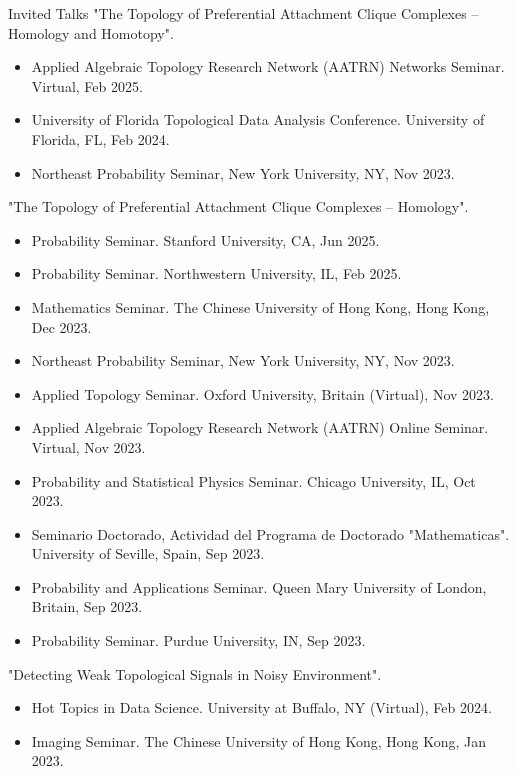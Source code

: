 \documentclass{resume} %
\begin{document}
\begin{rSection}{Invited Talks}
"The Topology of Preferential Attachment Clique Complexes -- Homology and Homotopy".
\begin{itemize}[noitemsep]
    \item Applied Algebraic Topology Research Network (AATRN) Networks Seminar. Virtual, Feb 2025.
    \item University of Florida Topological Data Analysis Conference. University of Florida, FL, Feb 2024.
    \item Northeast Probability Seminar, New York University, NY, Nov 2023.
\end{itemize}
"The Topology of Preferential Attachment Clique Complexes -- Homology".
\begin{itemize}[noitemsep]
    \item Probability Seminar. Stanford University, CA, Jun 2025.
    \item Probability Seminar. Northwestern University, IL, Feb 2025.
    \item Mathematics Seminar. The Chinese University of Hong Kong, Hong Kong, Dec 2023.
    \item Northeast Probability Seminar, New York University, NY, Nov 2023.
    \item Applied Topology Seminar. Oxford University, Britain (Virtual), Nov 2023.
    \item Applied Algebraic Topology Research Network (AATRN) Online Seminar. Virtual, Nov 2023.
    \item Probability and Statistical Physics Seminar. Chicago University, IL, Oct 2023.
    \item Seminario Doctorado, Actividad del Programa de Doctorado "Mathematicas". University of Seville, Spain, Sep 2023.
    \item Probability and Applications Seminar. Queen Mary University of London, Britain, Sep 2023.
    \item Probability Seminar. Purdue University, IN, Sep 2023.
\end{itemize}
"Detecting Weak Topological Signals in Noisy Environment".
\begin{itemize}[noitemsep]
    \item Hot Topics in Data Science. University at Buffalo, NY (Virtual), Feb 2024.
    \item Imaging Seminar. The Chinese University of Hong Kong, Hong Kong, Jan 2023.
\end{itemize}
\end{rSection}
\end{document}
